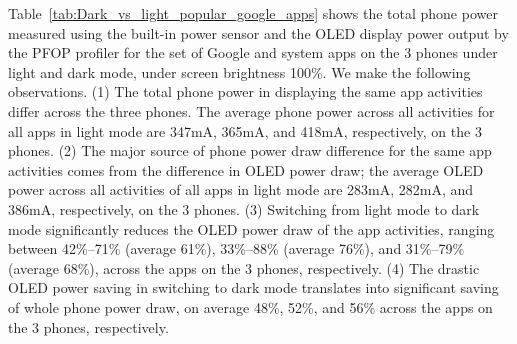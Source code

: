 Table~\ref{tab:Dark_vs_light_popular_google_apps} shows the total
phone power measured using the built-in power sensor and the
OLED display power output by the PFOP profiler
for the set of Google and system apps on the 3 phones under light and dark mode,
under screen brightness 100\%.
We make the following observations.
(1) The total phone power in displaying the same app activities
differ across the three phones. The average phone power across all activities for all apps
in light mode are 347mA, 365mA, and 418mA, respectively, on the 3 phones.
(2) The major source of phone power draw difference for the same app activities
comes from the difference in OLED power draw;
the average OLED power across all activities of all apps
in light mode are 283mA, 282mA, and 386mA, respectively, on the 3 phones.
(3) Switching from light mode to dark mode significantly reduces the OLED power
draw of the app activities, ranging between 42\%--71\% (average 61\%),
33\%--88\% (average 76\%), and 31\%--79\% (average 68\%),
across the apps on the 3 phones, respectively.
(4) The drastic OLED power saving in switching to dark mode 
translates into significant saving of whole phone power draw,
on average 48\%, 52\%, and 56\% across the apps on the 3 phones, respectively.
\fi

